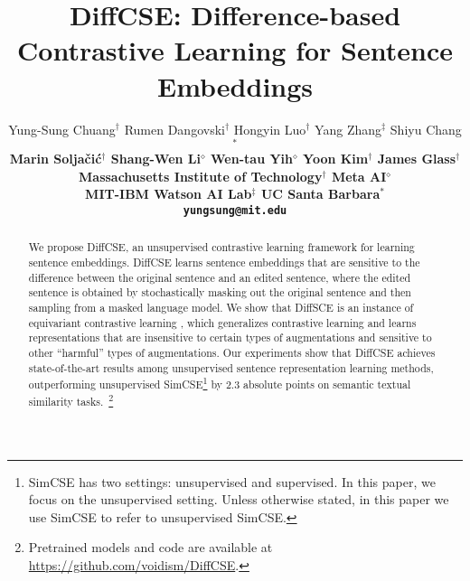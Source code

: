 \documentclass[11pt]{article}
\title{DiffCSE: Difference-based Contrastive Learning for Sentence Embeddings}
\author{Yung-Sung Chuang$^\dagger$ \quad Rumen Dangovski$^\dagger$ \quad Hongyin Luo$^\dagger$ \quad Yang Zhang$^\ddagger$ \quad Shiyu Chang$^\ast$ \\
\bf Marin Solja\v{c}i\'{c}$^\dagger$ \quad Shang-Wen Li$^\diamond$ \quad Wen-tau Yih$^\diamond$ \quad Yoon Kim$^{\dagger}$ \quad James Glass$^\dagger$ \\
  Massachusetts Institute of Technology$^\dagger$ \quad
  Meta AI$^\diamond$ \\
  MIT-IBM Watson AI Lab$^\ddagger$ \quad UC Santa Barbara$^\ast$ \\
  \texttt{yungsung@mit.edu} \\
    }
\newcommand{\diffcse}{DiffCSE\xspace}
\begin{document}
\maketitle
\begin{abstract}
\vspace{-1mm}
We propose \diffcse, an unsupervised contrastive learning framework for learning sentence embeddings. \diffcse learns sentence embeddings that are sensitive to the difference between the original sentence and an edited sentence, where the edited sentence is obtained by stochastically masking out the original sentence and then sampling from a masked language model. We show that DiffSCE is an instance of equivariant contrastive learning \cite{dangovski2021equivariant}, which generalizes contrastive learning and learns representations that are insensitive to certain types of augmentations and sensitive to other ``harmful'' types of augmentations. Our experiments show that DiffCSE achieves state-of-the-art results among unsupervised sentence representation learning methods, outperforming unsupervised SimCSE\footnote{SimCSE has two settings: unsupervised and supervised. In this paper, we focus on the unsupervised setting. Unless otherwise stated, in this paper we use SimCSE to refer to unsupervised SimCSE.} by 2.3 absolute points on semantic textual similarity tasks.~\footnote{Pretrained models and code are available at {\url{https://github.com/voidism/DiffCSE}}.}
\vspace{-2mm}
\end{abstract}
\vspace{-1mm}
\end{document}
